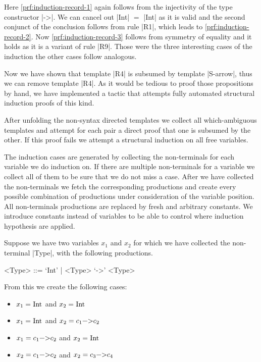 Here \ref{prf:induction-record-1} again follows from the injectivity
of the type constructor \code|->|. We can cancel out \code|Int| $=$
\code|Int| as it is valid and the second conjunct of the conclusion
follows from rule \code|R1|, which leads to
\ref{prf:induction-record-2}. Now \ref{prf:induction-record-3} follows
from symmetry of equality and it holds as it is a variant of rule
\code|R9|. Those were the three interesting cases of the induction the
other cases follow analogous.

Now we have shown that template \code|R4| is subsumed by template
\code|S-arrow|, thus we can remove template \code|R4|. As it would be
tedious to proof those propositions by hand, we have implemented a
tactic that attempts fully automated structural induction proofs of
this kind.

After unfolding the non-syntax directed templates we collect all
which-ambiguous templates and attempt for each pair a direct proof
that one is subsumed by the other. If this proof fails we attempt a
structural induction on all free variables.

The induction cases are generated by collecting the non-terminals for
each variable we do induction on. If there are multiple non-terminals
for a variable we collect all of them to be sure that we do not miss a
case. After we have collected the non-terminals we fetch the
corresponding productions and create every possible combination of
productions under consideration of the variable position. All
non-terminals productions are replaced by fresh and arbitrary
constants. We introduce constants instead of variables to be able to
control where induction hypothesis are applied.

\begin{example}
  Suppose we have two variables $x_1$ and $x_2$ for which we have
  collected the non-terminal \code|Type|, with the following
  productions.
  \begin{grammar}
    <Type> ::= `Int' | <Type> `->' <Type>
  \end{grammar}
  From this we create the following cases:
  \begin{multicols}{2}
  \begin{itemize}
  \item $x_1 = \text{\code|Int|}$ and $x_2 = \text{\code|Int|}$
  \item $x_1 = \text{\code|Int|}$ and $x_2 = c_1 \text{\code|->|} c_2$
  \item $x_1 = c_1 \text{\code|->|} c_2$ and $x_2 = \text{\code|Int|}$
  \item $x_2 = c_1 \text{\code|->|} c_2$ and $x_2 = c_3
    \text{\code|->|} c_4$
  \end{itemize}
  \end{multicols}
\label{ex:induction-cases}
\end{example}

